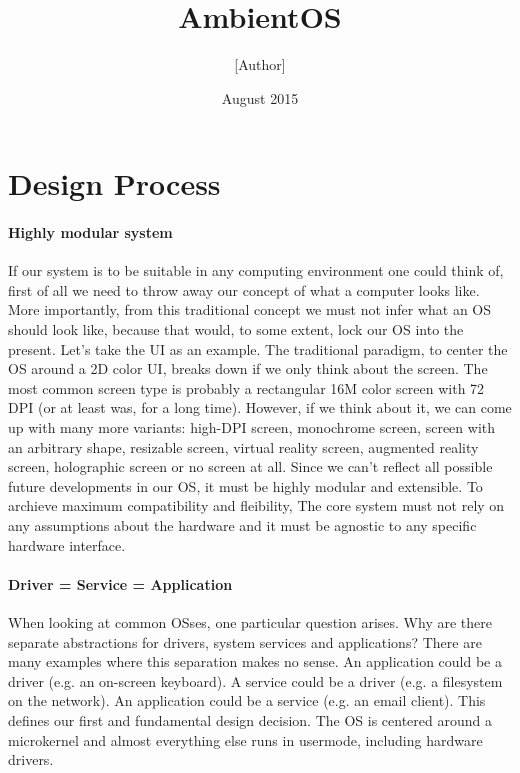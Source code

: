 \documentclass[a4paper]{article}
\title{AmbientOS}
\author{[Author]}
\date{August 2015}
\begin{document}
\maketitle

\section{Design Process}

\paragraph{Highly modular system} If our system is to be suitable in any computing environment one could think of, first of all we need to throw away our concept of what a computer looks like. More importantly, from this traditional concept we must not infer what an OS should look like, because that would, to some extent, lock our OS into the present. Let's take the UI as an example. The traditional paradigm, to center the OS around a 2D color UI, breaks down if we only think about the screen. The most common screen type is probably a rectangular 16M color screen with 72 DPI (or at least was, for a long time). However, if we think about it, we can come up with many more variants: high-DPI screen, monochrome screen, screen with an arbitrary shape, resizable screen, virtual reality screen, augmented reality screen, holographic screen or no screen at all.
Since we can't reflect all possible future developments in our OS, it must be highly modular and extensible. To archieve maximum compatibility and fleibility, The core system must not rely on any assumptions about the hardware and it must be agnostic to any specific hardware interface.

\paragraph{Driver = Service = Application} When looking at common OSses, one particular question arises. Why are there separate abstractions for drivers, system services and applications? There are many examples where this separation makes no sense. An application could be a driver (e.g. an on-screen keyboard). A service could be a driver (e.g. a filesystem on the network). An application could be a service (e.g. an email client).
This defines our first and fundamental design decision. The OS is centered around a microkernel and almost everything else runs in usermode, including hardware drivers.
\end{document}
